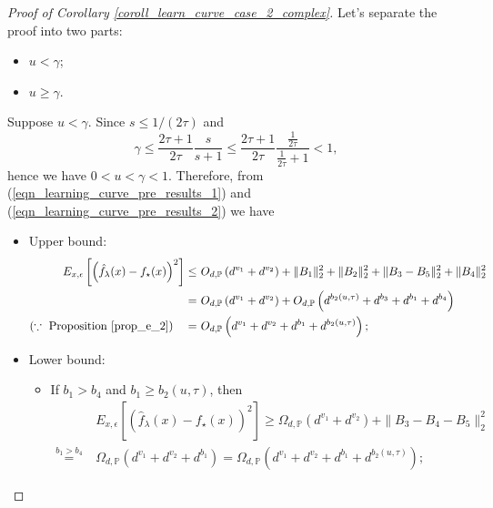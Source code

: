 \documentclass{article}
\theoremstyle{plain}
\theoremstyle{definition}
\theoremstyle{remark}
\begin{document}
\begin{appendix}
\vspace{10pt}


\begin{proof}[Proof of Corollary \ref{coroll_learn_curve_case_2_complex}]
Let's separate the proof into two parts:
\begin{itemize}
    \item [(i)] $u < \gamma$; 
    \item [(ii)] $u \geq \gamma$.
\end{itemize}





 Suppose $u < \gamma$. Since $s \leq 1/(2\tau)$ and
$$
\gamma \leq \frac{2\tau + 1}{2\tau} \frac{s}{s+1} \leq \frac{2\tau + 1}{2\tau} \frac{\frac{1}{2\tau}}{\frac{1}{2\tau}+1} < 1,
$$
hence we have $0 < u < \gamma <1$. Therefore, 
from (\ref{eqn_learning_curve_pre_results_1}) and (\ref{eqn_learning_curve_pre_results_2})
we have 
\begin{itemize}
    \item Upper bound:
    \begin{align*}
E_{x, \epsilon} \left[ \left(\hat{f}_{\lambda}(x) - f_{\star}(x) \right)^{2} \right]
\leq &~ O_{d, \mathbb{P}} \left( d^{v_1} + d^{v_2}\right) + \|B_1\|_{2}^{2} + \|B_2\|_{2}^{2} + \|B_3 - B_5\|_{2}^{2} + \|B_4\|_{2}^{2}\\
= &~
O_{d, \mathbb{P}} \left( d^{v_1} + d^{v_2}\right) + O_{d, \mathbb{P}}\left( d^{b_2(u, \tau)}  + d^{b_3} + d^{b_1} + d^{b_4} \right)\\
(\because \text{ Proposition \ref{prop_e_2}}) \quad = &~ O_{d, \mathbb{P}} \left( d^{v_1} + d^{v_2} + d^{b_1} + d^{b_2(u, \tau)}\right);
\end{align*}

\item Lower bound:
    \begin{itemize}
        \item If $b_1>b_4$ and $b_1 \geq b_2(u, \tau)$, then
\begin{align*}
&~ E_{x, \epsilon} \left[ \left(\hat{f}_{\lambda}(x) - f_{\star}(x) \right)^{2} \right]
\geq  \Omega_{d, \mathbb{P}} \left( d^{v_1} + d^{v_2} \right) + \|B_3-B_4-B_5\|_{2}^{2}\\
\overset{b_1 > b_4}{=} &~ \Omega_{d, \mathbb{P}} \left( d^{v_1} + d^{v_2} + d^{b_1}\right)
=
\Omega_{d, \mathbb{P}} \left( d^{v_1} + d^{v_2} + d^{b_1} + d^{b_2(u, \tau)}\right);
\end{align*}


\end{itemize}
\end{itemize}
\end{proof}
\end{appendix}
\end{document}
